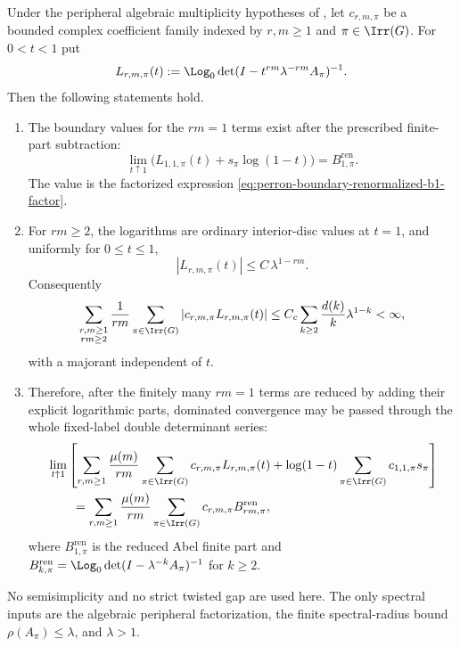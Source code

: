 \begin{lemma}
  \label{lem:perron-boundary-fixed-label-majorant}
  Under the peripheral algebraic multiplicity hypotheses of
  ,
  let \(c_{r,m,\pi}\) be a bounded complex coefficient family indexed by
  \(r,m\ge1\) and \(\pi\in\Irr(G)\).  For \(0<t<1\) put
  \[
    L_{r,m,\pi}(t):=
    \Log_0\det(I-t^{rm}\lambda^{-rm}A_\pi)^{-1}.
  \]
  Then the following statements hold.
  \begin{enumerate}[label=\textup{(\roman*)},leftmargin=*]
    \item The boundary values for the \(rm=1\) terms exist after the
    prescribed finite-part subtraction:
    \[
      \lim_{t\uparrow1}
      \bigl(L_{1,1,\pi}(t)+s_\pi\log(1-t)\bigr)
      =B_{1,\pi}^{\mathrm{ren}}.
    \]
    The value is the factorized expression
    \eqref{eq:perron-boundary-renormalized-b1-factor}.
    \item For \(rm\ge2\), the logarithms are ordinary interior-disc values
    at \(t=1\), and uniformly for \(0\le t\le1\),
    \begin{equation}\label{eq:perron-boundary-fixed-label-majorant-tail}
      |L_{r,m,\pi}(t)|
      \le C\,\lambda^{1-rm}.
    \end{equation}
    Consequently
    \[
      \sum_{\substack{r,m\ge1\\rm\ge2}}
        \frac{1}{rm}
        \sum_{\pi\in\Irr(G)}
          |c_{r,m,\pi}L_{r,m,\pi}(t)|
      \le
      C_c
      \sum_{k\ge2}\frac{d(k)}{k}\lambda^{1-k}<\infty,
    \]
    with a majorant independent of \(t\).
    \item Therefore, after the finitely many \(rm=1\) terms are reduced by
    adding their explicit logarithmic parts, dominated convergence may be
    passed through the whole fixed-label double determinant series:
    \begin{equation}\label{eq:perron-boundary-fixed-label-majorant-limit}
    \begin{aligned}
      &\lim_{t\uparrow1}
      \left[
        \sum_{r,m\ge1}\frac{\mu(m)}{rm}
          \sum_{\pi\in\Irr(G)}c_{r,m,\pi}L_{r,m,\pi}(t)
        +\log(1-t)\sum_{\pi\in\Irr(G)}c_{1,1,\pi}s_\pi
      \right]                                      \\
      &\qquad =
      \sum_{r,m\ge1}\frac{\mu(m)}{rm}
        \sum_{\pi\in\Irr(G)}c_{r,m,\pi}
          B_{rm,\pi}^{\mathrm{ren}},
    \end{aligned}
    \end{equation}
    where \(B_{1,\pi}^{\mathrm{ren}}\) is the reduced Abel finite part and
    \(B_{k,\pi}^{\mathrm{ren}}=\Log_0\det(I-\lambda^{-k}A_\pi)^{-1}\) for
    \(k\ge2\).
  \end{enumerate}
  No semisimplicity and no strict twisted gap are used here.  The only
  spectral inputs are the algebraic peripheral factorization, the finite
  spectral-radius bound \(\rho(A_\pi)\le\lambda\), and
  \(\lambda>1\).
\end{lemma}

